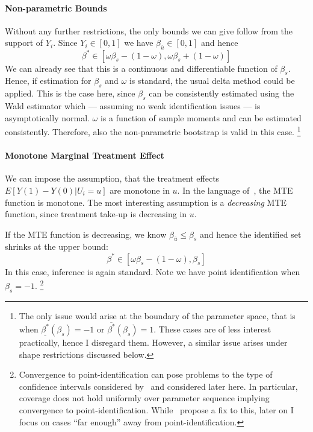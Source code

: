 \documentclass[12pt,a4paper,english]{article} %
\numberwithin{equation}{section}
\theoremstyle{definition}
\theoremstyle{remark}
\theoremstyle{plain}
\begin{document}
\paragraph{Non-parametric Bounds}
Without any further restrictions, the only bounds we can give follow from the support of $Y_i$.
Since $Y_i\in[0,1]$ we have $\beta_{\overline{u}} \in [0,1]$ and hence
\begin{equation*}
  \beta^* \in [\omega\beta_s - (1 - \omega), \omega\beta_s + (1 - \omega)]
\end{equation*}
We can already see that this is a continuous and differentiable function of $\beta_s$.
Hence, if estimation for $\beta_s$ and $\omega$ is standard, the usual delta method could be applied.
This is the case here, since $\beta_s$ can be consistently estimated using the Wald estimator which --- assuming no weak identification issues --- is asymptotically normal.
$\omega$ is a function of sample moments and can be estimated consistently.
Therefore, also the non-parametric bootstrap is valid in this case.
\footnote{The only issue would arise at the boundary of the parameter space, that is when $\underline{\beta^*}(\beta_s)=-1$ or $\overline{\beta^*}(\beta_s)=1$.
These cases are of less interest practically, hence I disregard them. However, a similar issue arises under shape restrictions discussed below.}

\paragraph{Monotone Marginal Treatment Effect}
We can impose the assumption, that the treatment effects $E[Y(1) - Y(0)|U_i=u]$ are monotone in $u$.
In the language of~\cite{mogstad2018using}, the MTE function is monotone.
The most interesting assumption is a \textit{decreasing} MTE function, since treatment take-up is decreasing in $u$.

If the MTE function is decreasing, we know $\beta_{\overline{u}} \leq \beta_s$ and hence the identified set shrinks at the upper bound:
\begin{equation*}
  \beta^* \in [\omega\beta_s - (1 - \omega), \beta_s]
\end{equation*}
In this case, inference is again standard. Note we have point identification when $\beta_s=-1$.
\footnote{Convergence to point-identification can pose problems to the type of confidence intervals considered by~\cite{imbens2004confidence} and considered later here.
In particular, coverage does not hold uniformly over parameter sequence implying convergence to point-identification.
While~\cite{imbens2004confidence} propose a fix to this, later on I focus on cases ``far enough'' away from point-identification.}
\end{document}
